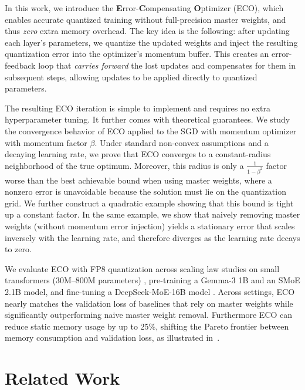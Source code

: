\documentclass[11pt, a4paper, onecolumn, copyright, goog]{google}
\newcommand{\methodname}{ECO}
\theoremstyle{plain}
\theoremstyle{definition}
\theoremstyle{remark}
\begin{document}
In this work, we introduce the \textbf{E}rror-\textbf{C}ompensating \textbf{O}ptimizer (\methodname{}), which enables accurate quantized training without full-precision master weights, and thus \textit{zero} extra memory overhead. The key idea is the following: after updating each layer's parameters, we quantize the updated weights and inject the resulting quantization error into {the optimizer's momentum buffer}. This creates an error-feedback loop that \textit{carries forward} the lost updates and compensates for them in subsequent steps, allowing updates to be applied directly to quantized parameters.

The resulting \methodname{} iteration is simple to implement and requires no extra hyperparameter tuning. It further comes with theoretical guarantees. We study the convergence behavior of \methodname{} applied to the SGD with momentum optimizer with momentum factor $\beta$. Under standard non-convex assumptions and a decaying learning rate, we prove that \methodname{} converges to a constant-radius neighborhood of the true optimum. Moreover, this radius is only a $\frac{1}{1-\beta^2}$ factor worse than the best achievable bound when using master weights, where a nonzero error is unavoidable because the solution must lie on the quantization grid. We further construct a quadratic example showing that this bound is tight up a constant factor. In the same example, we show that naively removing master weights (without momentum error injection) yields a stationary error that scales inversely with the learning rate, and therefore diverges as the learning rate decays to zero.

We evaluate \methodname{} with FP8 quantization across scaling law studies on small transformers (30M--800M parameters) \citep{quest,quartet}, pre-training a Gemma-3 1B \citep{gemma3} and an SMoE 2.1B model, and fine-tuning a DeepSeek-MoE-16B model \citep{deepseekmoe}. Across settings, \methodname{} nearly matches the validation loss of baselines that rely on master weights while significantly outperforming naive master weight removal. Furthermore \methodname{} can reduce static memory usage by up to 25\%, shifting the Pareto frontier between memory consumption and validation loss, as illustrated in~.

\section{Related Work}
\label{sec:related}
\end{document}
